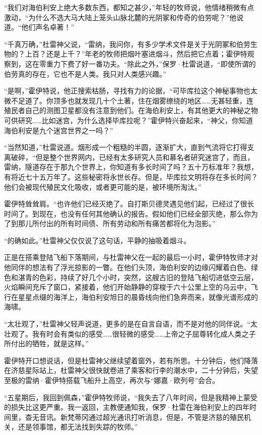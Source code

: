 \documentclass[AutoFakeBold=true]{book}
\begin{document}
``我们对海伯利安上绝大多数东西，都知之甚少，''年轻的牧师说，他情绪稍微有点激动，``为什么不选大马大陆上笼头山脉北麓的光阴冢和传奇的伯劳呢？''他说道。``他们声名卓著！''

``千真万确，''杜雷神父说，``雷纳，我问你，有多少学术文件是关于光阴冢和伯劳生物的？上百？还是上千？''年老的牧师把烟叶塞进烟斗，然后把它点着；霍伊特观察到，这在零重力下费了好一番功夫。``除此之外，''保罗·杜雷说道，``即使所谓的伯劳真的存在，它也不是人类。我只对人类感兴趣。''

``是啊，''霍伊特说，他正搜索枯肠，寻找有力的论据，``可毕库拉这个神秘事物也太微不足道了。你顶多也就发现几十个土著，住在烟雾缭绕的地区……无甚轻重，连殖民者自己的测图卫星都没有注意到他们。在海伯利安上，有其他更大的神秘之物可供研究……比如迷宫，为什么选择毕库拉呢？''霍伊特兴奋起来，``神父，你知道海伯利安是九个迷宫世界之一吗？''

``当然知道，''杜雷说道。烟形成一个粗糙的半圆，逐渐扩大，直到气流将它打得支离破碎，``但是整个世界网内，已经有太多研究人员和慕名者研究迷宫了，而且，雷纳，隧道存在于那九个世界上，你知道有多长时间了吗？五十万标准年？我想，有将近七十五万年了。这些秘密将永世长存。但是，毕库拉文明将存在多长时间？他们会被现代殖民文化吸收，或者更可能的是，被环境所淘汰。''

霍伊特耸耸肩。``也许他们已经灭绝了。自打斯贝德灵遇见他们起，已经过了很长时间了。到现在，也没有任何其他确认的报告。假如他们已经全部灭绝，那么你为了到那儿所付出的所有时间债、所有劳动和所有痛苦都将化为泡影。''

``的确如此。''杜雷神父仅仅说了这句话，平静的抽吸着烟斗。

正是在搭乘登陆飞船下落期间，与杜雷神父在一起的最后一小时，霍伊特牧师才对他同伴的想法有了浮光掠影的一瞥。在他们头顶，海伯利安的边缘闪耀着白色、绿色和湛青的色彩，持续了好几个小时，突然，这艘古旧的登陆飞船切进低空云层，火焰瞬间充斥了窗口，紧接着，他们开始静静的穿梭于六十公里上空的乌云中，飞行在星星点缀的海洋上，海伯利安旭日的晨昏线向他们急奔而来，就像光谱形成的海啸。

``太壮观了，''杜雷神父轻声说道，更多的是在自言自语，而不是对他的同伴说。``太壮观了。我有时会有类似的感受……很轻微的感受……上帝之子屈尊转化成人类之子所付出的牺牲，就是这样。''

霍伊特开口想说话，但是杜雷神父继续望着窗外，若有所思。十分钟后，他们降落在济慈星际站上，杜雷神父很快就卷进了乘客和行李的潮水中，二十分钟后，失望至极的雷纳·霍伊特搭载飞船升上高空，再次与``娜嘉·欧列号''会合。

\vspace*{1em}

``五星期后，我回到佩森，''霍伊特牧师说，``我失去了八年时间，但是我精神上蒙受的损失比这更严重。我一返回，主教便通知我，保罗·杜雷在海伯利安上的四年时间里，杳无音讯。新梵蒂冈通过超光通讯打听消息，但是，不管是济慈的殖民机关，还是领事馆，都无法找到失踪的牧师。''
\end{document}
